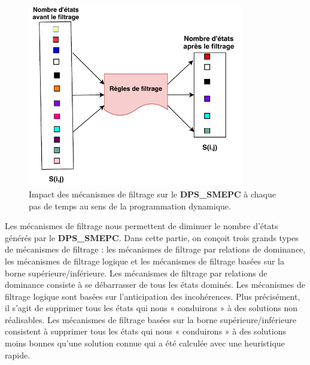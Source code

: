 \begin{figure}[H]
	\centerline{
		\includegraphics[height=8cm]{images_these/reglesfiltre_impact.pdf}}
	\caption[Impact des mécanismes de filtrage sur le DPS\_SMEPC]{Impact des mécanismes de filtrage sur le \textbf{DPS\_SMEPC} à chaque pas de temps au sens de la programmation dynamique.}
	\label{reglesfiltre_impact}
\end{figure}
Les mécanismes de filtrage nous permettent de diminuer le nombre d'états générés par le \textbf{DPS\_SMEPC}. Dans cette partie, on conçoit trois grands types de mécanismes de filtrage : les mécanismes de filtrage par relations de dominance, les mécanismes de filtrage logique et les mécanismes de filtrage basées sur la borne supérieure/inférieure. Les mécanismes de filtrage par relations de dominance consiste à se débarrasser de tous les états dominés. Les mécanismes de filtrage logique sont basées sur l'anticipation des incohérences. Plus précisément, il s'agit de supprimer tous les états qui nous « conduirons » à des solutions non réalisables. Les mécanismes de filtrage basées sur la borne supérieure/inférieure consistent à supprimer tous les états qui nous « conduirons » à des solutions moins bonnes qu'une solution connue qui a été calculée avec une heuristique rapide.

